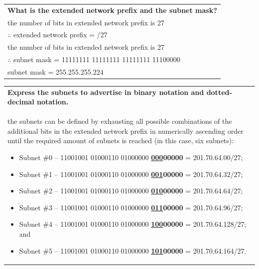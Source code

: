 \documentclass[a4paper]{systems-software}
\begin{document}
\newpage

\begin{longtabu} to \textwidth {| X[1,l] |}
	\hline
	\textbf{What is the extended network prefix and the subnet mask?} \\
	\vspace{2.5mm}
	the number of bits in extended network prefix is 27 \\
	$\therefore$ extended network prefix = /27 \\
	\vspace{2.5mm}
	the number of bits in extended network prefix is 27 \\
	$\therefore$ subnet mask = 11111111 11111111 11111111 11100000 \\
	subnet mask = 255.255.255.224 \\
	\hline
\end{longtabu}

\begin{longtabu} to \textwidth {| X[1,l] |}
	\hline
	\textbf{Express the subnets to advertise in binary notation and dotted-decimal notation.} \\
	\vspace{2.5mm}
	the subnets can be defined by exhausting all possible combinations of the additional bits in the extended network prefix in numerically ascending order until the required amount of subnets is reached (in this case, six subnets):
	\begin{itemize}
		\item Subnet \#0 -- 11001001 01000110 01000000 \textbf{\underline{000}00000} = 201.70.64.00/27;
		\item Subnet \#1 -- 11001001 01000110 01000000 \textbf{\underline{001}00000} = 201.70.64.32/27;
		\item Subnet \#2 -- 11001001 01000110 01000000 \textbf{\underline{010}00000} = 201.70.64.64/27;
		\item Subnet \#3 -- 11001001 01000110 01000000 \textbf{\underline{011}00000} = 201.70.64.96/27;
		\item Subnet \#4 -- 11001001 01000110 01000000 \textbf{\underline{100}00000} = 201.70.64.128/27; and
		\item Subnet \#5 -- 11001001 01000110 01000000 \textbf{\underline{101}00000} = 201.70.64.164/27.
	\end{itemize} \\
	\hline
\end{longtabu}
\end{document}
